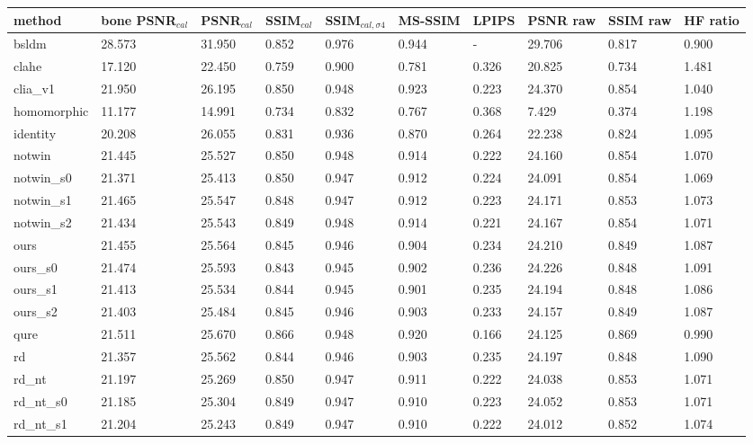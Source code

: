 \begin{tabular}{llllllllll}
\toprule
method & bone PSNR$_{cal}$ & PSNR$_{cal}$ & SSIM$_{cal}$ & SSIM$_{cal,\sigma4}$ & MS-SSIM & LPIPS & PSNR raw & SSIM raw & HF ratio \\
\midrule
bsldm & 28.573 & 31.950 & 0.852 & 0.976 & 0.944 & - & 29.706 & 0.817 & 0.900 \\
clahe & 17.120 & 22.450 & 0.759 & 0.900 & 0.781 & 0.326 & 20.825 & 0.734 & 1.481 \\
clia\_v1 & 21.950 & 26.195 & 0.850 & 0.948 & 0.923 & 0.223 & 24.370 & 0.854 & 1.040 \\
homomorphic & 11.177 & 14.991 & 0.734 & 0.832 & 0.767 & 0.368 & 7.429 & 0.374 & 1.198 \\
identity & 20.208 & 26.055 & 0.831 & 0.936 & 0.870 & 0.264 & 22.238 & 0.824 & 1.095 \\
notwin & 21.445 & 25.527 & 0.850 & 0.948 & 0.914 & 0.222 & 24.160 & 0.854 & 1.070 \\
notwin\_s0 & 21.371 & 25.413 & 0.850 & 0.947 & 0.912 & 0.224 & 24.091 & 0.854 & 1.069 \\
notwin\_s1 & 21.465 & 25.547 & 0.848 & 0.947 & 0.912 & 0.223 & 24.171 & 0.853 & 1.073 \\
notwin\_s2 & 21.434 & 25.543 & 0.849 & 0.948 & 0.914 & 0.221 & 24.167 & 0.854 & 1.071 \\
ours & 21.455 & 25.564 & 0.845 & 0.946 & 0.904 & 0.234 & 24.210 & 0.849 & 1.087 \\
ours\_s0 & 21.474 & 25.593 & 0.843 & 0.945 & 0.902 & 0.236 & 24.226 & 0.848 & 1.091 \\
ours\_s1 & 21.413 & 25.534 & 0.844 & 0.945 & 0.901 & 0.235 & 24.194 & 0.848 & 1.086 \\
ours\_s2 & 21.403 & 25.484 & 0.845 & 0.946 & 0.903 & 0.233 & 24.157 & 0.849 & 1.087 \\
qure & 21.511 & 25.670 & 0.866 & 0.948 & 0.920 & 0.166 & 24.125 & 0.869 & 0.990 \\
rd & 21.357 & 25.562 & 0.844 & 0.946 & 0.903 & 0.235 & 24.197 & 0.848 & 1.090 \\
rd\_nt & 21.197 & 25.269 & 0.850 & 0.947 & 0.911 & 0.222 & 24.038 & 0.853 & 1.071 \\
rd\_nt\_s0 & 21.185 & 25.304 & 0.849 & 0.947 & 0.910 & 0.223 & 24.052 & 0.853 & 1.071 \\
rd\_nt\_s1 & 21.204 & 25.243 & 0.849 & 0.947 & 0.910 & 0.222 & 24.012 & 0.852 & 1.074 \\

\end{tabular}
